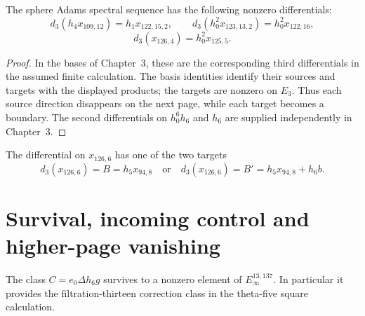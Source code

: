 \begin{theorem}
\label{sem:Computation:low-differentials}
The sphere Adams spectral sequence has the following nonzero
differentials:
\[
d_3(h_4x_{109,12})=h_1x_{122,15,2},\qquad
 d_3(h_0^2x_{123,13,2})=h_0^2x_{122,16},
\]
\[
d_3(x_{126,4})=h_0^2x_{125,5}.
\]
\end{theorem}
\begin{proof}
In the bases of Chapter~3, these are the corresponding third
differentials in the assumed finite calculation. The basis identities
identify their sources and targets with the displayed products; the
targets are nonzero on $E_3$. Thus each source direction disappears
on the next page, while each target becomes a boundary. The second
differentials on $h_0^6h_6$ and $h_6$ are supplied independently in
Chapter~3.
\end{proof}

\begin{theorem}
\label{sem:Computation:d3-candidates}
The differential on $x_{126,6}$ has one of the two targets
\[
 d_3(x_{126,6})=B=h_5x_{94,8}
 \quad\text{or}\quad
 d_3(x_{126,6})=B'=h_5x_{94,8}+h_6b.
\]
\end{theorem}

\section{Survival, incoming control and higher-page vanishing}

\begin{theorem}
\label{sem:Computation:correction-survival}
The class $C=e_0\Delta h_6g$ survives to a nonzero element of
$E_\infty^{13,137}$. In particular it provides the filtration-thirteen
correction class in the theta-five square calculation.
\end{theorem}

